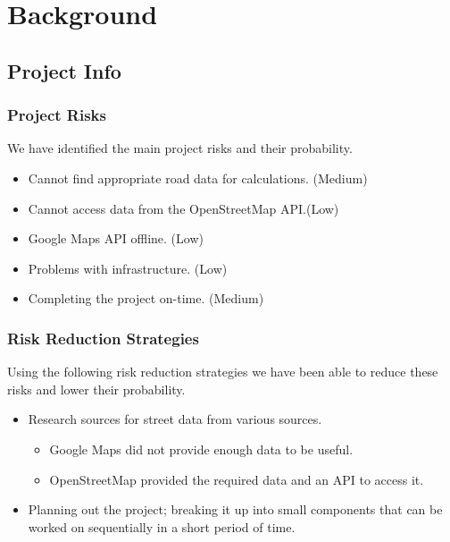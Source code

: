 \documentclass[a4paper,11pt]{article}
\begin{document}
\section{Background}

\subsection{Project Info}

\subsubsection{Project Risks}

We have identified the main project risks and their probability.

\begin{itemize}
  \item Cannot find appropriate road data for calculations. (Medium)
  \item Cannot access data from the OpenStreetMap API.\@ (Low)
  \item Google Maps API offline. (Low)
  \item Problems with infrastructure. (Low)
  \item Completing the project on-time. (Medium)
\end{itemize}

\subsubsection{Risk Reduction Strategies}

Using the following risk reduction strategies we have been able to reduce these
risks and lower their probability.

\begin{itemize}
  \item Research sources for street data from various sources.
    \begin{itemize}
      \item Google Maps did not provide enough data to be useful.
      \item OpenStreetMap provided the required data and an API to access it.
    \end{itemize}
  \item Planning out the project; breaking it up into small components that can
    be worked on sequentially in a short period of time.
\end{itemize}
\end{document}
